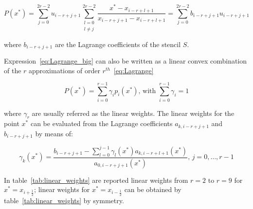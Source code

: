 \begin{equation}
  \label{eq:Lagrange_big}
  P(x^*) = \sum_{j=0}^{2r-2} u_{i-r+j+1} \sum_{\substack{l=0 \\ l \neq j}}^{2r-2} \frac{x^* - x_{i-r+l+1}}{x_{i-r+j+1} - x_{i-r+l+1}} = \sum_{j=0}^{2r-2} b_{i-r+j+1} u_{i-r+j+1}
\end{equation}

where $b_{i-r+j+1}$ are the Lagrange coefficients of the stencil $S$.

Expression~\eqref{eq:Lagrange_big} can also be written as a linear convex combination of the $r$ approximations of order $r^{th}$~\eqref{eq:Lagrange}

\begin{equation}
  \label{eq:pol_convex}
  P(x^*) = \sum_{i=0}^{r-1} \gamma_i p_i(x^*) \text{, with } \sum_{i=0}^{r-1} \gamma_i = 1
\end{equation}

where $\gamma_r$ are usually referred as the linear weights. The linear weights for the point $x^*$ can be evaluated from the Lagrange coefficients $a_{k,i-r+j+1}$ and $b_{i-r+j+1}$ by means of:

\begin{equation}
  \label{eq:linear_weights}
  \gamma_k(x^*) = \frac{b_{i-r+j+1} - \sum_{l=0}^{j-1} \gamma_l(x^*) a_{k,i-r+l+1}(x^*)}{a_{0,i-r+j+1}(x^*)} \text{, } j=0, \dots, r-1
\end{equation}

In table~\ref{tab:linear_weights} are reported linear weights from $r=2$ to $r=9$ for $x^*=x_{i+\frac{1}{2}}$; linear weights for $x^*=x_{i-\frac{1}{2}}$ can be obtained by table~\ref{tab:linear_weights} by symmetry.

